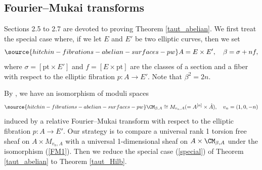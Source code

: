 





\subsection{Fourier--Mukai transforms}\label{Sec2.5}
Sections 2.5 to 2.7 are devoted to proving Theorem \ref{taut_abelian}.
We first treat the special case where, if we let  $E$ and $E'$ be two elliptic curves, then we set
\begin{equation}\label{special}
\source{hitchin-fibrations-abelian-surfaces-pw}
A= E \times E', \quad \beta = \sigma + nf,
\end{equation}
where  $\sigma = [\mathrm{pt} \times E']$ and $f = [E \times \mathrm{pt}]$ are the classes of a section and a fiber with respect to the elliptic fibration $p: A \to E'$. {Note that  $\beta^2=2n$.}


By \cite[Theorem 3.15]{Yo}, we have an isomorphism of  moduli spaces
\begin{equation}\label{FM1}
\source{hitchin-fibrations-abelian-surfaces-pw}
\CM_{\beta,A} \cong M_{v_n, A}(= A^{[n]} \times \hat{A}),\quad v_n = (1,0,-n)
\end{equation}
induced by a relative Fourier--Mukai transform with respect to the elliptic fibration $p: A \to E'$. Our strategy is to compare a universal rank 1 torsion free sheaf on $A\times M_{v_n, A}$ with a universal 1-dimensional sheaf on $A\times \CM_{\beta,A}$ under the isomorphism (\ref{FM1}). Then we reduce  the special case (\ref{special})
of Theorem \ref{taut_abelian} to Theorem \ref{taut_Hilb}.




